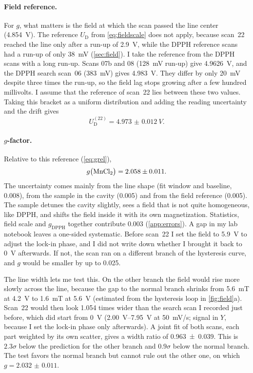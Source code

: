 \paragraph{Field reference.}
For $g$, what matters is the field at which the scan passed the line center (\qty{4.854}{V}). The reference
$U_\text{D}$ from \cref{eq:fieldscale} does not apply, because scan~22 reached the line only after a run-up of
\qty{2.9}{V}, while the DPPH reference scans had a run-up of only \qty{38}{mV} (\cref{sec:field}). I take the
reference from the DPPH scans with a long run-up. Scans 07b and 08 (\qty{128}{mV} run-up) give \qty{4.9626}{V}, and the
DPPH search scan~06 (\qty{383}{mV}) gives \qty{4.983}{V}. They differ by only \qty{20}{mV} despite three times the
run-up, so the field lag stops growing after a few hundred millivolts. I assume that the reference of scan~22 lies
between these two values. Taking this bracket as a uniform distribution and adding the reading uncertainty and the drift
gives
\begin{equation}\label{eq:udmn}
  U_\text{D}^{(22)}=\qty{4.973(12)}{V}.
\end{equation}

\paragraph{\texorpdfstring{$g$}{g}-factor.}
Relative to this reference (\cref{eq:grel}),
\begin{equation}\label{eq:gmn}
  g\bigl(\text{\ce{MnCl2}}\bigr)=\num{2.058(11)} .
\end{equation}
The uncertainty comes mainly from the line shape (fit window and baseline, \num{0.008}), from the sample in the cavity
(\num{0.005}) and from the field reference (\num{0.005}). The sample detunes the cavity slightly, sees a field that is
not quite homogeneous, like DPPH, and shifts the field inside it with its own magnetization. Statistics, field scale and
$g_\text{DPPH}$ together contribute \num{0.003} (\cref{app:errors}). A gap in my lab notebook leaves a one-sided
systematic. Before scan~22 I set the field to \qty{5.9}{V} to adjust the lock-in phase, and I did not write down whether
I brought it back to \qty{0}{V} afterwards. If not, the scan ran on a different branch of the hysteresis curve, and $g$
would be smaller by up to \num{0.025}.

The line width lets me test this. On the other branch the field would rise more slowly across the line, because the gap
to the normal branch shrinks from \qty{5.6}{mT} at \qty{4.2}{V} to \qty{1.6}{mT} at \qty{5.6}{V} (estimated from the
hysteresis loop in \cref{fig:field}a). Scan~22 would then look 1.054 times wider than the search scan I recorded just
before, which did start from \qty{0}{V} (\qtyrange{2.00}{7.95}{V} at \qty{50}{mV/s}; signal in $Y$, because I set the
lock-in phase only afterwards). A joint fit of both scans, each part weighted by its own scatter, gives a width ratio of
\num{0.963(39)}. This is $2.3\sigma$ below the prediction for the other branch and $0.9\sigma$ below the normal branch.
The test favors the normal branch but cannot rule out the other one, on which $g=\num{2.032(11)}$.

